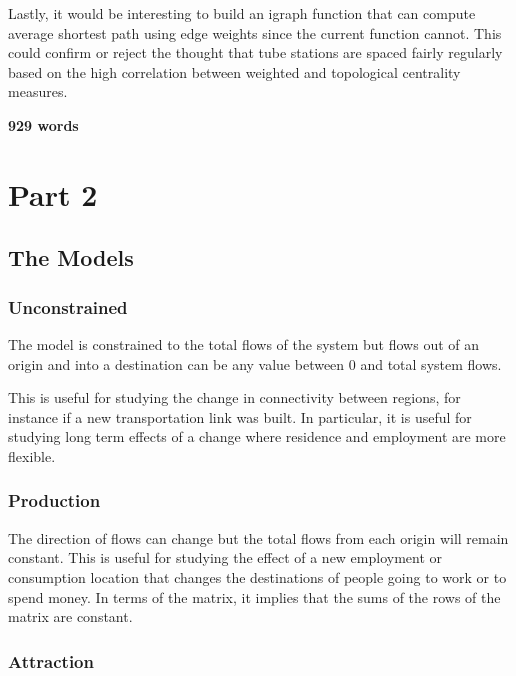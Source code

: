 \documentclass[11pt]{article} %
\begin{document}
Lastly, it would be interesting to build an igraph function that can compute average shortest path using edge weights since the current function cannot. This could confirm or reject the thought that tube stations are spaced fairly regularly based on the high correlation between weighted and topological centrality measures. 

\textbf{929 words}


\pagebreak

\section{Part 2}

\subsection{The Models}

\subsubsection{Unconstrained}

The model is constrained to the total flows of the system but flows out of an origin and into a destination can be any value between 0 and total system flows. 

This is useful for studying the change in connectivity between regions, for instance if a new transportation link was built. In particular, it is useful for studying long term effects of a change where residence and employment are more flexible. 

\subsubsection{Production}

The direction of flows can change but the total flows from each origin will remain constant. This is useful for studying the effect of a new employment or consumption location that changes the destinations of people going to work or to spend money. In terms of the matrix, it implies that the sums of the rows of the matrix are constant. 

\subsubsection{Attraction}
\end{document}
